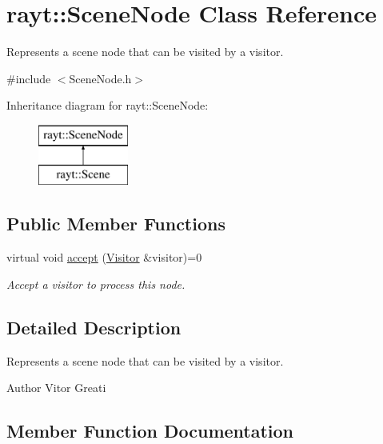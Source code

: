 \hypertarget{classrayt_1_1_scene_node}{}\section{rayt\+::Scene\+Node Class Reference}
\label{classrayt_1_1_scene_node}


Represents a scene node that can be visited by a visitor.  




{\ttfamily \#include $<$Scene\+Node.\+h$>$}

Inheritance diagram for rayt\+::Scene\+Node\+:\begin{figure}[H]
\begin{center}
\leavevmode
\includegraphics[height=2.000000cm]{classrayt_1_1_scene_node}
\end{center}
\end{figure}
\subsection*{Public Member Functions}
\begin{DoxyCompactItemize}
\item 
virtual void \mbox{\hyperlink{classrayt_1_1_scene_node_ad1505599b13aa1cac1f9bba9df7bec4b}{accept}} (\mbox{\hyperlink{classrayt_1_1_visitor}{Visitor}} \&visitor)=0
\begin{DoxyCompactList}\small\item\em Accept a visitor to process this node. \end{DoxyCompactList}\end{DoxyCompactItemize}


\subsection{Detailed Description}
Represents a scene node that can be visited by a visitor. 

\begin{DoxyAuthor}{Author}
Vitor Greati 
\end{DoxyAuthor}


\subsection{Member Function Documentation}
\mbox{\label{classrayt_1_1_scene_node_ad1505599b13aa1cac1f9bba9df7bec4b}} 
